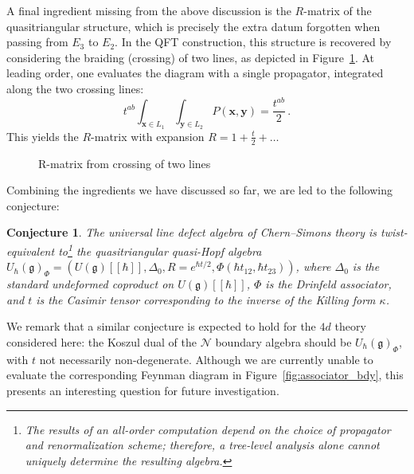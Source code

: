 \documentclass[11pt]{article}
\numberwithin{equation}{section}
\newtheorem{conj}{Conjecture}[section]
\begin{document}
A final ingredient missing from the above discussion is the $R$-matrix of the quasitriangular structure, which is precisely the extra datum forgotten when passing from $E_3$ to $E_2$. In the QFT construction, this structure is recovered by considering the braiding (crossing) of two lines, as depicted in Figure~\ref{fig:Rmatrix_CS}. At leading order, one evaluates the diagram with a single propagator, integrated along the two crossing lines:
\begin{equation}
	t^{ab}\int_{\boldsymbol{x} \in L_1}\int_{\boldsymbol{y} \in L_2} P(\boldsymbol{x},\boldsymbol{y}) = \frac{t^{ab}}{2}\,.
\end{equation}
This yields the $R$-matrix with expansion  $R = 1 + \frac{t}{2}  + \dots$


\begin{figure}[h]
\centering
{}
\caption{R-matrix from crossing of two lines}
\label{fig:Rmatrix_CS}
\end{figure}

Combining the ingredients we have discussed so far, we are led to the following conjecture:
\begin{conj}
  The universal line defect algebra of Chern--Simons theory is twist-equivalent to\footnote{The results of an all-order computation depend on the choice of propagator and renormalization scheme; therefore, a tree-level analysis alone cannot uniquely determine the resulting algebra.} the quasitriangular quasi-Hopf algebra $U_{\hbar}(\mathfrak{g})_{\Phi} = (U(\mathfrak{g})[[\hbar]], \Delta_0, R = e^{\hbar t/2}, \Phi(\hbar t_{12},\hbar t_{23}))$, where $\Delta_0$ is the standard undeformed coproduct on $U(\mathfrak{g})[[\hbar]]$, $\Phi$ is the Drinfeld associator, and $t$ is the Casimir tensor corresponding to the inverse of the Killing form $\kappa$.
\end{conj}
We remark that a similar conjecture is expected to hold for the $4d$ theory considered here: the Koszul dual of the $\mathcal{N}$ boundary algebra should be $U_{\hbar}(\mathfrak{g})_{\Phi}$, with $t$ not necessarily non-degenerate. Although we are currently unable to evaluate the corresponding Feynman diagram in Figure~\ref{fig:associator_bdy}, this presents an interesting question for future investigation.
\end{document}
